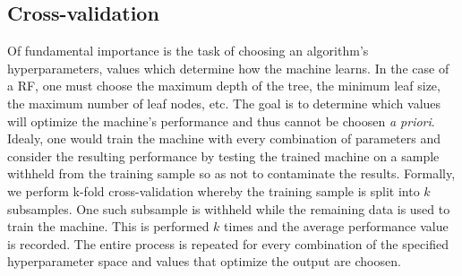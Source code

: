 \documentclass[twocolumn]{aastex6}
\begin{document}

\subsection{Cross-validation}
Of fundamental importance is the task of choosing an algorithm's hyperparameters, 
values which determine how the machine learns.  In the case of a RF, one must 
choose the maximum depth of the tree, the minimum leaf size, the maximum
number of leaf nodes, etc. The goal is to determine which values will optimize 
the machine's performance and thus cannot be choosen \textit{a priori}. 
Idealy, one would train the machine with every combination of parameters and 
consider the resulting performance by testing the trained machine on a sample
withheld from the training sample so as not to contaminate the results. 
Formally, we perform k-fold cross-validation whereby the training sample is split
into $k$ subsamples. One such subsample is withheld while the remaining data is
used to train the machine. This is performed $k$ times and the average performance
value is recorded. The entire process is repeated for every combination of the 
specified hyperparameter space and values that optimize the output are choosen. 

 
\end{document}
